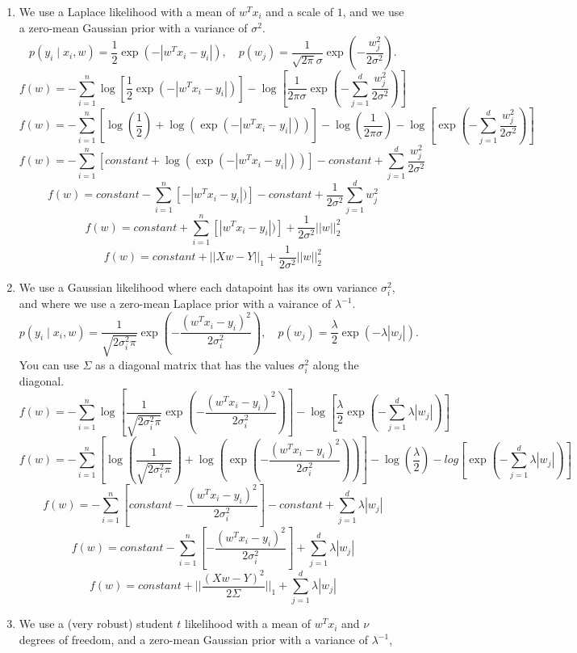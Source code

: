 \documentclass{article}
\def\ans#1{{\color{ans}#1}}
\def\half{\frac 1 2}
\def\enum#1{\begin{enumerate}#1\end{enumerate}}
\begin{document}
\enum{
\item We use a Laplace likelihood with a mean of $w^Tx_i$ and a scale of $1$, and we use a zero-mean Gaussian prior with a variance of $\sigma^2$.
\[
p(y_i \mid x_i, w) = \frac 1 2 \exp(-|w^Tx_i - y_i|), \quad p(w_j) = \frac{1}{\sqrt{2\pi}\sigma}\exp\left(-\frac{w_j^2}{2\sigma^2}\right).
\]
\ans{
    \[ f(w) = -\sum_{i=1}^{n} \log \left[ \half{\exp(-| w^Tx_i - y_i |)} \right] - \log \left[ \frac{1}{2\pi\sigma} \exp(-\sum_{j=1}^d \frac{w_j^2}{2\sigma^2}) \right] \]
    \[ f(w) = -\sum_{i=1}^{n} \left[ \log(\half) + \log(\exp(-| w^Tx_i - y_i |)) \right] - \log(\frac{1}{2\pi\sigma}) - \log \left[ \exp(-\sum_{j=1}^d \frac{w_j^2}{2\sigma^2}) \right] \]
    \[ f(w) = -\sum_{i=1}^{n} \left[ constant + \log(\exp(-| w^Tx_i - y_i |)) \right] - constant + \sum_{j=1}^d \frac{w_j^2}{2\sigma^2} \]
    \[ f(w) =  constant -\sum_{i=1}^{n} \left[ -| w^Tx_i - y_i |) \right] - constant + \frac{1}{2\sigma^2} \sum_{j=1}^d w_j^2 \]
    \[ f(w) =  constant +\sum_{i=1}^{n} \left[ | w^Tx_i - y_i |) \right] + \frac{1}{2\sigma^2} || w ||_2^2 \]
    \[ f(w) =  constant + || Xw - Y ||_1 + \frac{1}{2\sigma^2} || w ||_2^2 \]
}
\item We use a Gaussian likelihood where each datapoint has its own variance $\sigma_i^2$, and where we use a zero-mean Laplace prior with a vairance of $\lambda^{-1}$.
\[
p(y_i \mid x_i,w) = \frac{1}{\sqrt{2\sigma_i^2\pi}}\exp\left(-\frac{(w^Tx_i - y_i)^2}{2\sigma_i^2}\right), \quad p(w_j) = \frac{\lambda}{2}\exp(-\lambda|w_j|).
\]
You can use $\Sigma$ as a diagonal matrix that has the values $\sigma_i^2$ along the diagonal.
\ans{
    \[ f(w) = - \sum_{i=1}^n \log \left[ \frac{1}{\sqrt{2\sigma_i^2 \pi}} \exp(-\frac{(w^Tx_i-y_i)^2}{2\sigma_i^2}) \right] - \log \left[ \frac{\lambda}{2} \exp \left(-\sum_{j=1}^d \lambda | w_j| \right) \right] \]
    \[ f(w) = - \sum_{i=1}^n \left[ \log \left(\frac{1}{\sqrt{2\sigma_i^2 \pi}}\right) + \log \left( \exp(-\frac{(w^Tx_i-y_i)^2}{2\sigma_i^2}) \right) \right] - \log \left(\frac{\lambda}{2}\right) - log \left[ \exp \left(-\sum_{j=1}^d \lambda | w_j| \right) \right] \]
    \[ f(w) = - \sum_{i=1}^n \left[ constant -\frac{(w^Tx_i-y_i)^2}{2\sigma_i^2} \right] - constant + \sum_{j=1}^d \lambda | w_j|  \]
    \[ f(w) = constant - \sum_{i=1}^n \left[ -\frac{(w^Tx_i-y_i)^2}{2\sigma_i^2} \right] + \sum_{j=1}^d \lambda | w_j|  \]
    \[ f(w) = constant + || \frac{(Xw - Y)^2}{2\Sigma} ||_1 + \sum_{j=1}^d \lambda | w_j|  \]
}
\item We use a (very robust) student $t$ likelihood with a mean of $w^Tx_i$ and $\nu$ degrees of freedom, and a zero-mean Gaussian prior with a variance of $\lambda^{-1}$,
}
\end{document}
